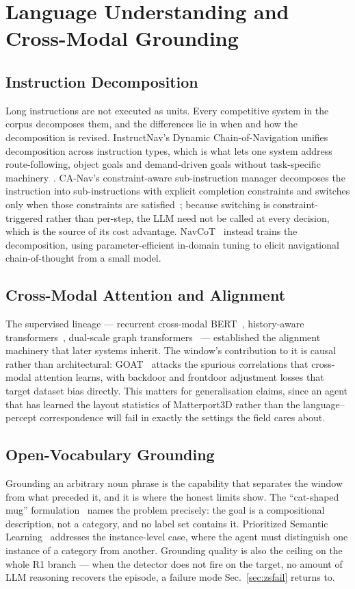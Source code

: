 \documentclass[journal]{IEEEtran}
\begin{document}
\section{Language Understanding and Cross-Modal Grounding}\label{sec:language}

\subsection{Instruction Decomposition}
Long instructions are not executed as units. Every competitive system in the
corpus decomposes them, and the differences lie in when and how the
decomposition is revised. InstructNav's Dynamic Chain-of-Navigation
unifies decomposition across instruction types, which is what lets one
system address route-following, object goals and demand-driven goals
without task-specific machinery~\cite{long2024instructnav}. CA-Nav's
constraint-aware sub-instruction manager decomposes the instruction into
sub-instructions with explicit completion
constraints and switches only when those constraints are
satisfied~\cite{chen2025constraint}; because switching is
constraint-triggered rather than per-step, the LLM need not be called at
every decision, which is the source of its cost advantage.
NavCoT~\cite{lin2025navcot} instead trains the decomposition, using
parameter-efficient in-domain tuning to elicit navigational chain-of-thought
from a small model.

\subsection{Cross-Modal Attention and Alignment}
The supervised lineage --- recurrent cross-modal
BERT~\cite{hong2021recurrent}, history-aware
transformers~\cite{chen2021history}, dual-scale graph
transformers~\cite{chen2022think} --- established the alignment machinery
that later systems inherit. The window's contribution to it is causal
rather than architectural: GOAT~\cite{wang2024vision} attacks the spurious
correlations that cross-modal attention learns, with backdoor and frontdoor
adjustment losses that target dataset bias directly. This matters for
generalisation claims, since an agent that has learned the layout statistics
of Matterport3D rather than the language--percept correspondence will fail
in exactly the settings the field cares about.

\subsection{Open-Vocabulary Grounding}
Grounding an arbitrary noun phrase is the capability that separates the
window from what preceded it, and it is where the honest limits show. The
``cat-shaped mug'' formulation~\cite{dorbala2024embodied} names the problem
precisely: the goal is a compositional description, not a category, and no
label set contains it. Prioritized Semantic
Learning~\cite{sun2024prioritized} addresses the instance-level case, where
the agent must distinguish one instance of a category from another.
Grounding quality is also the ceiling on the whole R1 branch --- when the
detector does not fire on the target, no amount of LLM reasoning recovers
the episode, a failure mode Sec.~\ref{sec:zsfail} returns to.
\end{document}
